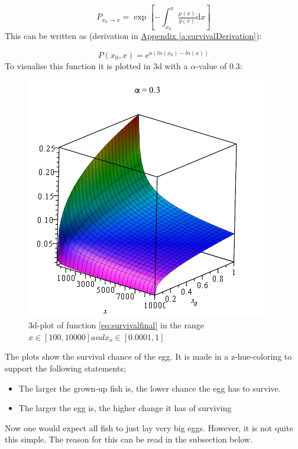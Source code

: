 \documentclass{article}
\numberwithin{equation}{section} %
\newcommand{\me}{\mathrm{e}}
\newcommand{\md}{\mathrm{d}}
\begin{document}
\begin{equation}
    P_{x_0\rightarrow x} = \exp\left[{-\int_{x_0}^{x}\tfrac{\mu(x)}{g(x)}\md x}\right]
\end{equation}
This can be written as (derivation in \hyperref[a:survivalDerivation]{Appendix \ref{a:survivalDerivation}})\label{jmp:a:survivalDerivation}:

\begin{equation}\label{eq:survivalfinal}
    P(x_0,x) = \me^{a(ln(x_0)-ln(x))}
\end{equation}
To visualise this function it is plotted in 3d with a $\alpha$-value of 0.3:

\begin{figure}[H]
\centering
    \includegraphics[width=.6\textwidth]{exercises/ex5p1.png}
    \caption{3d-plot of function \ref{eq:survivalfinal} in the range $x \in [100,10000] and x_o \in [0.0001,1] $}
    \label{fig:a2p1}
\end{figure}
The plots show the survival chance of the egg. It is made in a z-hue-coloring to support the following statements; 
\begin{itemize}
  \item The larger the grown-up fish is, the lower chance the egg has to survive.
  \item The larger the egg is, the higher change it has of surviving
\end{itemize}
Now one would expect all fish to just lay very big eggs. However, it is not quite this simple. The reason for this can be read in the subsection below.
\end{document}
